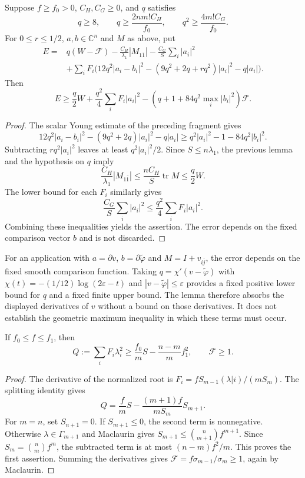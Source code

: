 \begin{lemma}\label{draft:599-fixed-comparison-absorption}
Suppose $f\geq f_0>0$, $C_H,C_G\geq0$, and $q$ satisfies
\[
 q\geq8,\qquad q\geq\frac{2nm!C_H}{f_0},\qquad
 q^2\geq\frac{4m!C_G}{f_0}.
\]
For $0\leq r\leq1/2$, $a,b\in\mathbb C^n$ and $M$ as above, put
\begin{align*}
 E={}&q(W-\mathcal F)-\frac{C_H}{\lambda_1}|M_{1\bar1}|
             -\frac{C_G}{S}\sum_i|a_i|^2\\
 &+\sum_iF_i\bigl(12q^2|a_i-b_i|^2
             -(9q^2+2q+rq^2)|a_i|^2-q|a_i|\bigr).
\end{align*}
Then
\[
 E\geq\frac q2W+\frac{q^2}{4}\sum_iF_i|a_i|^2
       -(q+1+84q^2\max_i|b_i|^2)\mathcal F.
\]
\end{lemma}
\begin{proof}
The scalar Young estimate of the preceding fragment gives
\[
 12q^2|a_i-b_i|^2-(9q^2+2q)|a_i|^2-q|a_i|
 \geq q^2|a_i|^2-1-84q^2|b_i|^2.
\]
Subtracting $rq^2|a_i|^2$ leaves at least $q^2|a_i|^2/2$. Since $S\leq n\lambda_1$, the previous lemma and the hypothesis on $q$ imply
\[
 \frac{C_H}{\lambda_1}|M_{1\bar1}|
 \leq\frac{nC_H}{S}\operatorname{tr}M\leq\frac q2 W.
\]
The lower bound for each $F_i$ similarly gives
\[
 \frac{C_G}{S}\sum_i|a_i|^2
             \leq\frac{q^2}{4}\sum_iF_i|a_i|^2.
\]
Combining these inequalities yields the assertion. The error depends on the fixed comparison vector $b$ and is not discarded.
\end{proof}

For an application with $a=\partial v$, $b=\partial\widetilde\varphi$ and $M=I+v_{i\bar j}$, the error depends on the fixed smooth comparison function. Taking $q=\chi'(v-\widetilde\varphi)$ with $\chi(t)=-(1/12)\log(2\varepsilon-t)$ and $|v-\widetilde\varphi|\leq\varepsilon$ provides a fixed positive lower bound for $q$ and a fixed finite upper bound. The lemma therefore absorbs the displayed derivatives of $v$ without a bound on those derivatives. It does not establish the geometric maximum inequality in which these terms must occur.

\begin{lemma}\label{draft:599-quadratic-coercivity}
If $f_0\leq f\leq f_1$, then
\[
 Q:=\sum_iF_i\lambda_i^2
       \geq\frac{f_0}{m}S-\frac{n-m}{m}f_1^2,
 \qquad \mathcal F\geq1.
\]
\end{lemma}
\begin{proof}
The derivative of the normalized root is $F_i=fS_{m-1}(\lambda|i)/(mS_m)$. The splitting identity gives
\[
 Q=\frac f m S-\frac{(m+1)f}{mS_m}S_{m+1}.
\]
For $m=n$, set $S_{n+1}=0$. If $S_{m+1}\leq0$, the second term is nonnegative. Otherwise $\lambda\in\Gamma_{m+1}$ and Maclaurin gives $S_{m+1}\leq\binom n{m+1}f^{m+1}$. Since $S_m=\binom nm f^m$, the subtracted term is at most $(n-m)f^2/m$. This proves the first assertion. Summing the derivatives gives $\mathcal F=f\sigma_{m-1}/\sigma_m\geq1$, again by Maclaurin.
\end{proof}

